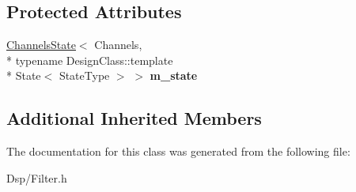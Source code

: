 \subsection*{Protected Attributes}
\begin{DoxyCompactItemize}
\item 
\hypertarget{classDsp_1_1FilterDesign_adb2480f5518a6ad10986290e7bc25a46}{\hyperlink{classDsp_1_1ChannelsState}{Channels\-State}$<$ Channels, \\*
typename Design\-Class\-::template \\*
State$<$ State\-Type $>$ $>$ {\bfseries m\-\_\-state}}\label{classDsp_1_1FilterDesign_adb2480f5518a6ad10986290e7bc25a46}

\end{DoxyCompactItemize}
\subsection*{Additional Inherited Members}


The documentation for this class was generated from the following file\-:\begin{DoxyCompactItemize}
\item 
Dsp/Filter.\-h\end{DoxyCompactItemize}
